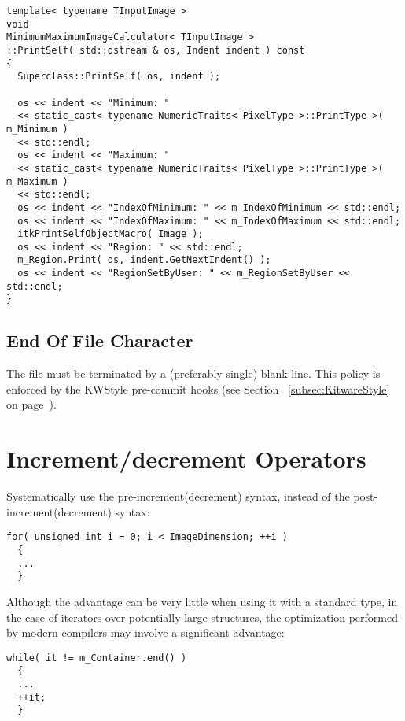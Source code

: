\small
\begin{verbatim}
template< typename TInputImage >
void
MinimumMaximumImageCalculator< TInputImage >
::PrintSelf( std::ostream & os, Indent indent ) const
{
  Superclass::PrintSelf( os, indent );

  os << indent << "Minimum: "
  << static_cast< typename NumericTraits< PixelType >::PrintType >( m_Minimum )
  << std::endl;
  os << indent << "Maximum: "
  << static_cast< typename NumericTraits< PixelType >::PrintType >( m_Maximum )
  << std::endl;
  os << indent << "IndexOfMinimum: " << m_IndexOfMinimum << std::endl;
  os << indent << "IndexOfMaximum: " << m_IndexOfMaximum << std::endl;
  itkPrintSelfObjectMacro( Image );
  os << indent << "Region: " << std::endl;
  m_Region.Print( os, indent.GetNextIndent() );
  os << indent << "RegionSetByUser: " << m_RegionSetByUser << std::endl;
}
\end{verbatim}
\normalsize


\subsection{End Of File Character}
\label{subsec:EndOfFileCharacter}

The file must be terminated by a (preferably single) blank line.
This policy is enforced by the KWStyle pre-commit hooks (see Section
~\ref{subsec:KitwareStyle} on page~\pageref{subsec:KitwareStyle}).


\section{Increment/decrement Operators}
\label{sec:IncrementDecrementOperators}

Systematically use the pre-increment(decrement) syntax, instead of the
post-increment(decrement) syntax:

\small
\begin{verbatim}
for( unsigned int i = 0; i < ImageDimension; ++i )
  {
  ...
  }
\end{verbatim}
\normalsize

Although the advantage can be very little when using it with a standard type,
in the case of iterators over potentially large structures, the optimization
performed by modern compilers may involve a significant advantage:

\small
\begin{verbatim}
while( it != m_Container.end() )
  {
  ...
  ++it;
  }
\end{verbatim}
\normalsize


